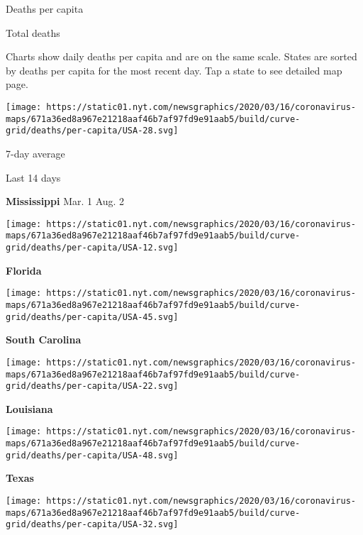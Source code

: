 Deaths per capita

Total deaths

Charts show daily deaths per capita and are on the same scale. States
are sorted by deaths per capita for the most recent day. Tap a state to
see detailed map page.

\href{https://www.nytimes.com/interactive/2020/us/mississippi-coronavirus-cases.html}{}

\texttt{[image: https://static01.nyt.com/newsgraphics/2020/03/16/coronavirus-maps/671a36ed8a967e21218aaf46b7af97fd9e91aab5/build/curve-grid/deaths/per-capita/USA-28.svg]}

7-day average

Last 14 days

\textbf{Mississippi} Mar. 1 Aug. 2

\href{https://www.nytimes.com/interactive/2020/us/florida-coronavirus-cases.html}{}

\texttt{[image: https://static01.nyt.com/newsgraphics/2020/03/16/coronavirus-maps/671a36ed8a967e21218aaf46b7af97fd9e91aab5/build/curve-grid/deaths/per-capita/USA-12.svg]}

\textbf{Florida}

\href{https://www.nytimes.com/interactive/2020/us/south-carolina-coronavirus-cases.html}{}

\texttt{[image: https://static01.nyt.com/newsgraphics/2020/03/16/coronavirus-maps/671a36ed8a967e21218aaf46b7af97fd9e91aab5/build/curve-grid/deaths/per-capita/USA-45.svg]}

\textbf{South Carolina}

\href{https://www.nytimes.com/interactive/2020/us/louisiana-coronavirus-cases.html}{}

\texttt{[image: https://static01.nyt.com/newsgraphics/2020/03/16/coronavirus-maps/671a36ed8a967e21218aaf46b7af97fd9e91aab5/build/curve-grid/deaths/per-capita/USA-22.svg]}

\textbf{Louisiana}

\href{https://www.nytimes.com/interactive/2020/us/texas-coronavirus-cases.html}{}

\texttt{[image: https://static01.nyt.com/newsgraphics/2020/03/16/coronavirus-maps/671a36ed8a967e21218aaf46b7af97fd9e91aab5/build/curve-grid/deaths/per-capita/USA-48.svg]}

\textbf{Texas}

\href{https://www.nytimes.com/interactive/2020/us/nevada-coronavirus-cases.html}{}

\texttt{[image: https://static01.nyt.com/newsgraphics/2020/03/16/coronavirus-maps/671a36ed8a967e21218aaf46b7af97fd9e91aab5/build/curve-grid/deaths/per-capita/USA-32.svg]}

